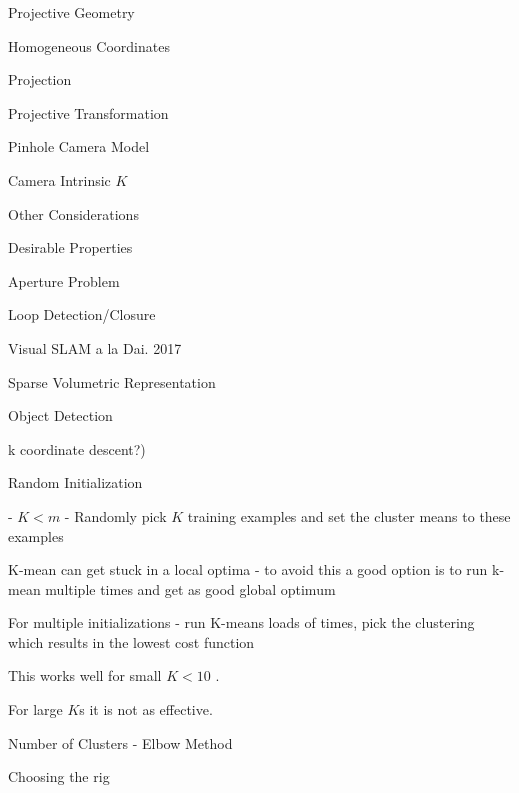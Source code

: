 \begin{section}
\begin{subsubsection}
\begin{subsubsection}
\begin{subsubsection}
\begin{section}{Projective Geometry}
\begin{subsection}{Homogeneous Coordinates}
\begin{subsubsection}
{\begin{subsubsection}{Projection}
\begin{subsubsection}{Projective Transformation}
\begin{subsection}
\begin{subsubsection}
\begin{subsubsection}
\begin{subsubsection}
{\begin{subsubsection}
\begin{subsection}
\begin{subsection} {Pinhole Camera Model}
\begin{subsection} {Camera Intrinsic $K$}
\begin{subsection}
\begin{subsection}
\begin{subsubsection}{Other Considerations}
{\begin{subsection}
\begin{subsubsection}{Desirable Properties}
\begin{section}
\begin{subsection}
\begin{subsection}
\begin{subsection}
\begin{section}
\begin{subsection}
\begin{subsubsection}
\begin{subsubsection}
\begin{subsection}
\begin{section}
\begin{subsection}
\begin{subsubsection}{Aperture Problem}
\begin{subsubsection}
{\begin{section}
\begin{subsubsection}
\begin{subsubsection}
\begin{subsubsection}
\begin{subsection}
\begin{subsection}
\begin{subsection}
\begin{subsection}
\begin{subsection}
\begin{subsection}
\begin{subsection}
\begin{subsubsection}
{\begin{subsubsection}
{\begin{subsubsection}
\begin{section}
\begin{section}
\begin{section}
\begin{subsubsection}
\begin{subsubsection}{Loop Detection/Closure}
\begin{subsubsection}{Visual SLAM a la Dai. 2017}
\begin{subsubsection}{Sparse Volumetric Representation}
\begin{subsection}
\begin{section}{Object Detection}
\begin{subsubsection}
{\begin{subsection}
\begin{subsection}
\begin{section}
\begin{section}
\begin{subsection}
\begin{subsubsection}
\begin{subsubsection}
\begin{subsection}
\begin{subsection}
\begin{subsubsection}
\begin{subsubsection}
\begin{subsubsection}
{\begin{subsection}
\begin{subsection}
\begin{subsection}
\begin{subsection}
\begin{section}
\begin{subsection}
\begin{subsubsection}
\begin{subsubsection}
\begin{subsubsection}
\begin{subsubsection}
\begin{subsubsection}
\begin{subsubsection}
\begin{subsection}
\begin{subsubsection}
\begin{subsection}
\begin{subsection}
\begin{subsubsection}
\begin{subsubsection}
\begin{subsection}
\begin{subsubsection}
{{\begin{section}
\begin{section}
\begin{subsection}
{{{\begin{subsubsection}
\begin{subsubsection}
\begin{subsection}
{\begin{section}
\begin{section}
\begin{section}
\begin{section}
\begin{subsection}
{\begin{section}
\begin{subsection}
\begin{subsubsection}
{\begin{subsubsection}
{k coordinate descent?)

\begin{subsubsection}{ Random Initialization

- $K < m$
- Randomly pick $K$ training examples and set the cluster means to these examples

K-mean can get stuck in a local optima - to avoid this a good option is to run k-mean multiple times and get as good global optimum

For multiple initializations - run K-means loads of times, pick the clustering which results in the lowest cost function

This works well for small $K < 10$ .

For large $K$s it is not as effective.

\begin{subsubsection}{ Number of Clusters - Elbow Method

Choosing the rig}
\end{subsubsection}}
\end{subsubsection}}
\end{subsubsection}}
\end{subsubsection}
\end{subsection}
\end{section}}
\end{subsection}
\end{section}
\end{section}
\end{section}
\end{section}}
\end{subsection}
\end{subsubsection}
\end{subsubsection}}}}
\end{subsection}
\end{section}
\end{section}}}
\end{subsubsection}
\end{subsection}
\end{subsubsection}
\end{subsubsection}
\end{subsection}
\end{subsection}
\end{subsubsection}
\end{subsection}
\end{subsubsection}
\end{subsubsection}
\end{subsubsection}
\end{subsubsection}
\end{subsubsection}
\end{subsubsection}
\end{subsection}
\end{section}
\end{subsection}
\end{subsection}
\end{subsection}
\end{subsection}}
\end{subsubsection}
\end{subsubsection}
\end{subsubsection}
\end{subsection}
\end{subsection}
\end{subsubsection}
\end{subsubsection}
\end{subsection}
\end{section}
\end{section}
\end{subsection}
\end{subsection}}
\end{subsubsection}
\end{section}
\end{subsection}
\end{subsubsection}
\end{subsubsection}
\end{subsubsection}
\end{subsubsection}
\end{section}
\end{section}
\end{section}
\end{subsubsection}}
\end{subsubsection}}
\end{subsubsection}
\end{subsection}
\end{subsection}
\end{subsection}
\end{subsection}
\end{subsection}
\end{subsection}
\end{subsection}
\end{subsubsection}
\end{subsubsection}
\end{subsubsection}
\end{section}}
\end{subsubsection}
\end{subsubsection}
\end{subsection}
\end{section}
\end{subsection}
\end{subsubsection}
\end{subsubsection}
\end{subsection}
\end{section}
\end{subsection}
\end{subsection}
\end{subsection}
\end{section}
\end{subsubsection}
\end{subsection}}
\end{subsubsection}
\end{subsection}
\end{subsection}
\end{subsection}
\end{subsection}
\end{subsection}
\end{subsubsection}}
\end{subsubsection}
\end{subsubsection}
\end{subsubsection}
\end{subsection}
\end{subsubsection}
\end{subsubsection}}
\end{subsubsection}
\end{subsection}
\end{section}
\end{subsubsection}
\end{subsubsection}
\end{subsubsection}
\end{section}
